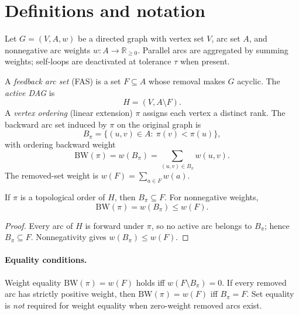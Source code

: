 \section{Definitions and notation}
\label{sec:or1-problem}

Let $G=(V,A,w)$ be a directed graph with vertex set $V$, arc set $A$, and nonnegative arc weights $w:A\to\mathbb{R}_{\ge 0}$.
Parallel arcs are aggregated by summing weights; self-loops are deactivated at tolerance $\tau$ when present.

A \emph{feedback arc set} (FAS) is a set $F\subseteq A$ whose removal makes $G$ acyclic.
The \emph{active DAG} is
\begin{equation}
    H=(V,A\setminus F).
    \label{eq:or1-active-dag}
\end{equation}
A \emph{vertex ordering} (linear extension) $\pi$ assigns each vertex a distinct rank.
The backward arc set induced by $\pi$ on the original graph is
\begin{equation}
    B_\pi=\{(u,v)\in A:\ \pi(v)<\pi(u)\},
    \label{eq:or1-backward-set}
\end{equation}
with ordering backward weight
\begin{equation}
    \mathrm{BW}(\pi)=w(B_\pi)=\sum_{(u,v)\in B_\pi} w(u,v).
    \label{eq:or1-bw}
\end{equation}
The removed-set weight is $w(F)=\sum_{a\in F} w(a)$.

\begin{proposition}
\label{prop:or1-subset}
If $\pi$ is a topological order of $H$, then $B_\pi\subseteq F$. For nonnegative weights,
\begin{equation}
    \mathrm{BW}(\pi)=w(B_\pi)\le w(F).
    \label{eq:or1-inequality}
\end{equation}
\end{proposition}

\begin{proof}
Every arc of $H$ is forward under $\pi$, so no active arc belongs to $B_\pi$; hence $B_\pi\subseteq F$. Nonnegativity gives $w(B_\pi)\le w(F)$.
\end{proof}

\paragraph{Equality conditions.}
Weight equality $\mathrm{BW}(\pi)=w(F)$ holds iff $w(F\setminus B_\pi)=0$.
If every removed arc has strictly positive weight, then $\mathrm{BW}(\pi)=w(F)$ iff $B_\pi=F$.
Set equality is \emph{not} required for weight equality when zero-weight removed arcs exist.

